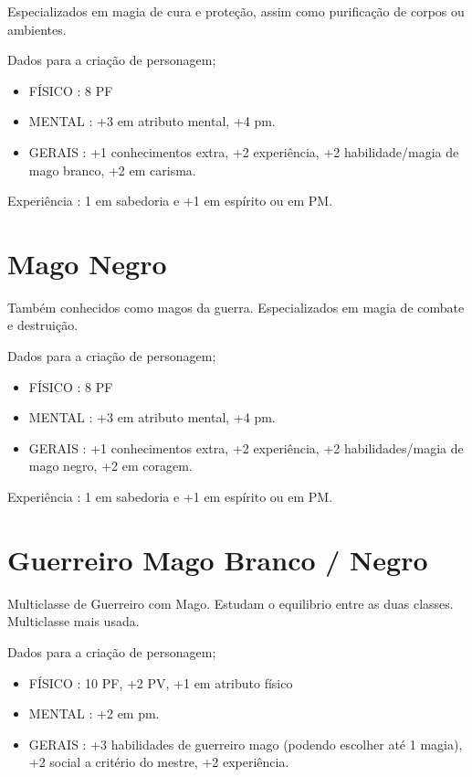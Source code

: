 Especializados em magia de cura e proteção, assim como purificação de corpos ou ambientes.

Dados para a criação de personagem;

\begin{itemize}

	\item FÍSICO : 8 PF

	\item MENTAL : +3 em atributo mental, +4 pm. 

	\item GERAIS : +1 conhecimentos extra, +2 experiência, +2 habilidade/magia de mago branco, +2 em carisma.

\end{itemize}

Experiência : 1 em sabedoria e +1 em espírito ou em PM.

\section{Mago Negro}

Também conhecidos como magos da guerra. Especializados em magia de combate e destruição.

Dados para a criação de personagem;

\begin{itemize}

	\item FÍSICO : 8 PF

	\item MENTAL : +3 em atributo mental, +4 pm. 

	\item GERAIS : +1 conhecimentos extra, +2 experiência, +2 habilidades/magia de mago negro, +2 em coragem.

\end{itemize}

Experiência : 1 em sabedoria e +1 em espírito ou em PM.

\section{Guerreiro Mago Branco / Negro}

Multiclasse de Guerreiro com Mago. Estudam o equilibrio entre as duas classes. Multiclasse mais usada. 

Dados para a criação de personagem;

\begin{itemize}


	\item FÍSICO : 10 PF, +2 PV, +1 em atributo físico 

	\item MENTAL : +2 em pm.

	\item GERAIS : +3 habilidades de guerreiro mago (podendo escolher até 1 magia), +2 social a critério do mestre, +2 experiência.

\end{itemize}

